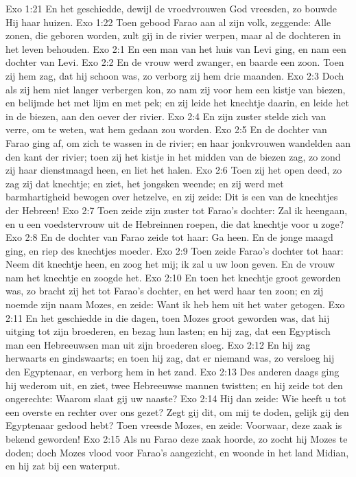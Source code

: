 Exo 1:21  En het geschiedde, dewijl de vroedvrouwen God vreesden, zo bouwde Hij haar huizen.
Exo 1:22  Toen gebood Farao aan al zijn volk, zeggende: Alle zonen, die geboren worden, zult gij in de rivier werpen, maar al de dochteren in het leven behouden.
Exo 2:1  En een man van het huis van Levi ging, en nam een dochter van Levi.
Exo 2:2  En de vrouw werd zwanger, en baarde een zoon. Toen zij hem zag, dat hij schoon was, zo verborg zij hem drie maanden.
Exo 2:3  Doch als zij hem niet langer verbergen kon, zo nam zij voor hem een kistje van biezen, en belijmde het met lijm en met pek; en zij leide het knechtje daarin, en leide het in de biezen, aan den oever der rivier.
Exo 2:4  En zijn zuster stelde zich van verre, om te weten, wat hem gedaan zou worden.
Exo 2:5  En de dochter van Farao ging af, om zich te wassen in de rivier; en haar jonkvrouwen wandelden aan den kant der rivier; toen zij het kistje in het midden van de biezen zag, zo zond zij haar dienstmaagd heen, en liet het halen.
Exo 2:6  Toen zij het open deed, zo zag zij dat knechtje; en ziet, het jongsken weende; en zij werd met barmhartigheid bewogen over hetzelve, en zij zeide: Dit is een van de knechtjes der Hebreen!
Exo 2:7  Toen zeide zijn zuster tot Farao's dochter: Zal ik heengaan, en u een voedstervrouw uit de Hebreinnen roepen, die dat knechtje voor u zoge?
Exo 2:8  En de dochter van Farao zeide tot haar: Ga heen. En de jonge maagd ging, en riep des knechtjes moeder.
Exo 2:9  Toen zeide Farao's dochter tot haar: Neem dit knechtje heen, en zoog het mij; ik zal u uw loon geven. En de vrouw nam het knechtje en zoogde het.
Exo 2:10  En toen het knechtje groot geworden was, zo bracht zij het tot Farao's dochter, en het werd haar ten zoon; en zij noemde zijn naam Mozes, en zeide: Want ik heb hem uit het water getogen.
Exo 2:11  En het geschiedde in die dagen, toen Mozes groot geworden was, dat hij uitging tot zijn broederen, en bezag hun lasten; en hij zag, dat een Egyptisch man een Hebreeuwsen man uit zijn broederen sloeg.
Exo 2:12  En hij zag herwaarts en gindswaarts; en toen hij zag, dat er niemand was, zo versloeg hij den Egyptenaar, en verborg hem in het zand.
Exo 2:13  Des anderen daags ging hij wederom uit, en ziet, twee Hebreeuwse mannen twistten; en hij zeide tot den ongerechte: Waarom slaat gij uw naaste?
Exo 2:14  Hij dan zeide: Wie heeft u tot een overste en rechter over ons gezet? Zegt gij dit, om mij te doden, gelijk gij den Egyptenaar gedood hebt? Toen vreesde Mozes, en zeide: Voorwaar, deze zaak is bekend geworden!
Exo 2:15  Als nu Farao deze zaak hoorde, zo zocht hij Mozes te doden; doch Mozes vlood voor Farao's aangezicht, en woonde in het land Midian, en hij zat bij een waterput.
